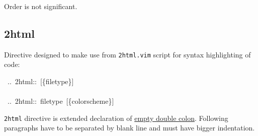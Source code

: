 \documentclass[12pt]{article}
\begin{document}
Order is not significant.

\hypertarget{l2html}{}
\subsection{2html}
\begin{center}
\end{center}

Directive designed to make use from \texttt{2html.vim} script for syntax
highlighting of code:

\begin{ttfamily}\begin{flushleft}
\mbox{~..~2html::~[\{filetype\}]}\\
\mbox{}\\
\mbox{~..~2html::~filetype~[\{colorscheme\}]}\\
\end{flushleft}\end{ttfamily}

\texttt{2html} directive is extended declaration of \href{\#lempty-double-colon}{empty double colon}.
Following paragraphs have to be separated by blank line and must have
bigger indentation.
\end{document}
